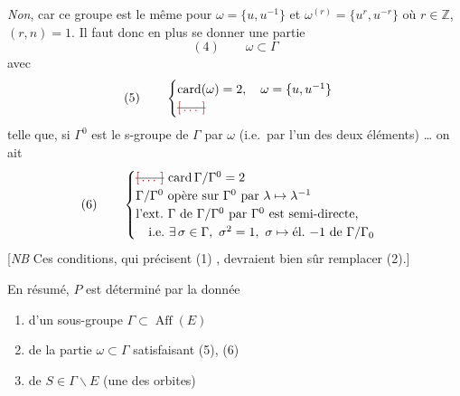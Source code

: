 \documentclass[11pt,a4paper]{article}
\begin{document}
\emph{Non}, car ce groupe est le même pour  $\omega = \{u,
u^{-1}\}$ et $\omega^{(r)} = \{u^r, u^{-r}\}$ où $r \in \mathbb{Z}$,
$(r, n) = 1$. Il faut donc en plus se donner une partie
\[
  (4) \qquad \omega \subset \Gamma
\]
avec
\[
  (5) \qquad
  \begin{cases}
    \operatorname{card}(\omega) = 2, \quad \omega = \{u, u^{-1}\} \\
    \text{\struck{\ill{}}}
  \end{cases}
\]
\struck{\ill{}} telle que, si $\Gamma^{0}$ est le s-groupe de $\Gamma$
 par $\omega$ (i.e.\ par l'un  des
deux éléments) … on ait
\[
  (6) \qquad
  \begin{cases}
    \text{\struck{\ill{}}}\,\operatorname{card} \Gamma/\Gamma^{0} = 2 \\
    \Gamma/\Gamma^{0} \ \text{opère sur}\ \Gamma^{0}\ \text{par}\
    \lambda \mapsto \lambda^{-1} \\
    \text{l'ext.\ } \Gamma\ \text{de}\ \Gamma/\Gamma^{0}\ \text{par}\
    \Gamma^{0}\ \text{est semi-directe,} \\
    \quad \text{i.e.}\ \exists\, \sigma \in \Gamma,\ \sigma^2 = 1,\
    \sigma \mapsto \text{él.}\ {-1}\ \text{de}\ \Gamma/\Gamma_0
  \end{cases}
\]
[\emph{NB} Ces conditions, qui précisent (1) , devraient bien sûr remplacer (2).]

En résumé, $P$ est déterminé par la donnée
\begin{enumerate}
  \item[a)] d'un sous-groupe $\Gamma \subset \operatorname{Aff}(E)$
  \item[b)] de la partie $\omega \subset \Gamma$ satisfaisant (5), (6)
  \item[c)] de $S \in \Gamma \backslash E$ (une des orbites)
\end{enumerate}
\end{document}
